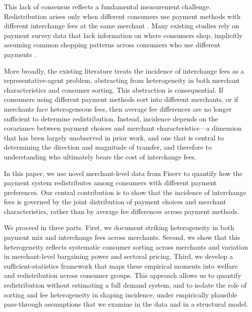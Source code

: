 \documentclass[11pt,english]{article}
\theoremstyle{remark}
\begin{document}
This lack of consensus reflects a fundamental measurement challenge. 
Redistribution arises only when different consumers use payment methods with different interchange fees at the same merchant \citep{Gans2018}.
Many existing studies rely on payment survey data that lack information on where consumers shop, implicitly assuming common shopping patterns across consumers who use different payments \citep{Felt.etal2023}.

More broadly, the existing literature treats the incidence of interchange fees as a representative-agent problem, abstracting from heterogeneity in both merchant characteristics and consumer sorting. This abstraction is consequential. If consumers using different payment methods sort into different merchants, or if merchants face heterogeneous fees, then average fee differences are no longer sufficient to determine redistribution. 
Instead, incidence depends on the covariance between payment choices and merchant characteristics---a dimension that has been largely unobserved in prior work, and one that is central to determining the direction and magnitude of transfer, and therefore to understanding who ultimately bears the cost of interchange fees.

In this paper, we use novel merchant-level data from Fiserv to quantify how the payment system redistributes among consumers with different payment preferences.
Our central contribution is to show that the incidence of interchange fees is governed by the joint distribution of payment choices and merchant characteristics, rather than by average fee differences across payment methods.

We proceed in three parts.
First, we document striking heterogeneity in both payment mix and interchange fees across merchants.
Second, we show that this heterogeneity reflects systematic consumer sorting across merchants and variation in merchant-level bargaining power and sectoral pricing. 
Third, we develop a sufficient-statistics framework that maps these empirical moments into welfare and redistribution across consumer groups. 
This approach allows us to quantify redistribution without estimating a full demand system, and to isolate the role of sorting and fee heterogeneity in shaping incidence, under empirically plausible pass-through assumptions that we examine in the data and in a structural model.
\end{document}
